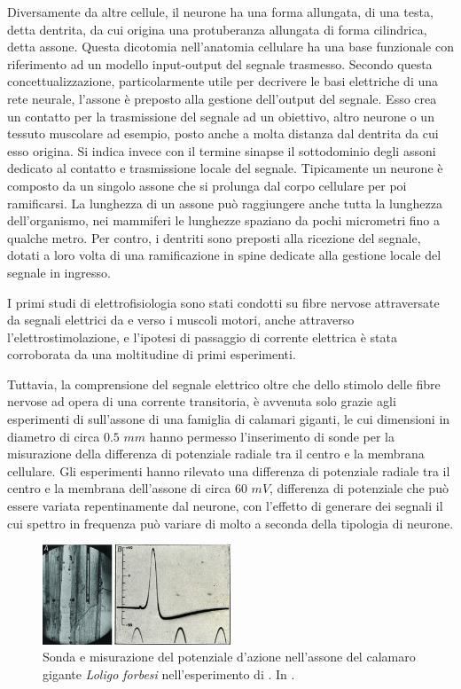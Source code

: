 Diversamente da altre cellule, il neurone ha una forma allungata, di una testa, detta dentrita, da cui origina una protuberanza allungata di forma cilindrica, detta assone. Questa dicotomia nell'anatomia cellulare ha una base funzionale con riferimento ad un modello input-output del segnale trasmesso. Secondo questa concettualizzazione, particolarmente utile per decrivere le basi elettriche di una rete neurale, l'assone è preposto alla gestione dell'output del segnale. Esso crea un contatto per la trasmissione del segnale ad un obiettivo, altro neurone o un tessuto muscolare ad esempio, posto anche a molta distanza dal dentrita da cui esso origina. Si indica invece con il termine sinapse il sottodominio degli assoni dedicato al contatto e trasmissione locale del segnale. Tipicamente un neurone è composto da un singolo assone che si prolunga dal corpo cellulare per poi ramificarsi. La lunghezza di un assone può raggiungere anche tutta la lunghezza dell'organismo, nei mammiferi le lunghezze spaziano da pochi micrometri fino a qualche metro.
Per contro, i dentriti sono preposti alla ricezione del segnale, dotati a loro volta di una ramificazione in spine dedicate alla gestione locale del segnale in ingresso.

I primi studi di elettrofisiologia sono stati condotti su fibre nervose attraversate da segnali elettrici da e verso i muscoli motori, anche attraverso l'elettrostimolazione, e l'ipotesi di passaggio di corrente elettrica è stata corroborata da una moltitudine di primi esperimenti.

Tuttavia, la comprensione del segnale elettrico oltre che dello stimolo delle fibre nervose ad opera di una corrente transitoria, è avvenuta solo grazie agli esperimenti di \cite{Hodgkin1952} sull'assone di una famiglia di calamari giganti, le cui dimensioni in diametro di circa $0.5$ $mm$ hanno permesso l'inserimento di sonde per la misurazione della differenza di potenziale radiale tra il centro e la membrana cellulare.
Gli esperimenti hanno rilevato una differenza di potenziale radiale tra il centro e la membrana dell'assone di circa $60$ $mV$, differenza di potenziale che può essere variata repentinamente dal neurone, con l'effetto di generare dei segnali il cui spettro in frequenza può variare di molto a seconda della tipologia di neurone.

\begin{figure}%
\centering    
\includegraphics[width=0.5\textwidth]{Pictures/ActionPotential.jpg}
\caption[Esperimento di \cite{Hodgkin1952}]
{ Sonda e misurazione del potenziale d'azione nell'assone del calamaro gigante {\it Loligo forbesi} nell'esperimento di \cite{Hodgkin1952}. In \cite{Schwiening2012}. }
\label{fig:ActionPotential}
\end{figure}





